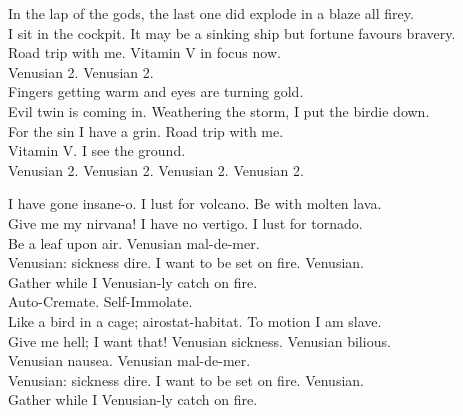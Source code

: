 


In the lap of the gods, the last one did explode in a blaze all firey. \\
I sit in the cockpit. It may be a sinking ship but fortune favours bravery. \\
Road trip with me. Vitamin V in focus now. \\

Venusian 2. Venusian 2. \\

Fingers getting warm and eyes are turning gold. \\
Evil twin is coming in. Weathering the storm, I put the birdie down. \\
For the sin I have a grin. Road trip with me. \\
Vitamin V. I see the ground. \\

Venusian 2. Venusian 2. Venusian 2. Venusian 2. \\




I have gone insane-o. I lust for volcano. Be with molten lava. \\
Give me my nirvana! I have no vertigo. I lust for tornado. \\
Be a leaf upon air. Venusian mal-de-mer. \\

Venusian: sickness dire. I want to be set on fire. Venusian. \\
Gather while I Venusian-ly catch on fire. \\

Auto-Cremate. Self-Immolate. \\

Like a bird in a cage; airostat-habitat. To motion I am slave. \\
Give me hell; I want that! Venusian sickness. Venusian bilious. \\
Venusian nausea. Venusian mal-de-mer. \\

Venusian: sickness dire. I want to be set on fire. Venusian. \\
Gather while I Venusian-ly catch on fire. \\

